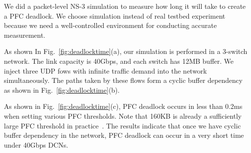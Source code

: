 We did a packet-level NS-3 simulation to measure how long it will take to create a PFC deadlock. We choose simulation instead of real testbed experiment because we need a well-controlled environment for conducting accurate measurement. 

As shown In Fig.~\ref{fig:deadlocktime}(a), our simulation is performed in a 3-switch network. The link capacity is 40Gbps, and each switch has 12MB buffer. We inject three UDP fows with infinite traffic demand into the network simultaneously. The paths taken by these flows form a cyclic buffer dependency as shown in Fig.~\ref{fig:deadlocktime}(b).

As shown in Fig.~\ref{fig:deadlocktime}(c), PFC deadlock occurs in less than 0.2ms when setting various PFC thresholds. Note that 160KB is already a sufficiently large PFC threshold in practice~\cite{dcqcn}. The results indicate that once we have cyclic buffer dependency in the network, PFC deadlock can occur in a very short time under 40Gbps DCNs.
